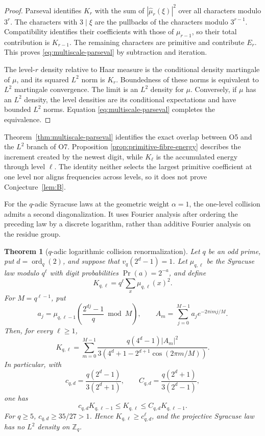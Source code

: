 \documentclass[11pt]{article}
\newtheorem{theorem}{Theorem}[section]
\theoremstyle{definition}
\theoremstyle{remark}
\DeclareMathOperator{\ord}{ord}
\begin{document}
\begin{proof}
Parseval identifies $K_r$ with the sum of
$|\widehat\mu_r(\xi)|^2$ over all characters modulo $3^r$. The
characters with $3\mid\xi$ are the pullbacks of the characters modulo
$3^{r-1}$. Compatibility identifies their coefficients with those of
$\mu_{r-1}$, so their total contribution is $K_{r-1}$. The remaining
characters are primitive and contribute $E_r$. This proves
\eqref{eq:multiscale-parseval} by subtraction and iteration.

The level-$r$ density relative to Haar measure is the conditional
density martingale of $\mu$, and its squared $L^2$ norm is $K_r$.
Boundedness of these norms is equivalent to $L^2$ martingale
convergence. The limit is an $L^2$ density for $\mu$. Conversely, if
$\mu$ has an $L^2$ density, the level densities are its conditional
expectations and have bounded $L^2$ norms. Equation
\eqref{eq:multiscale-parseval} completes the equivalence.
\end{proof}

Theorem~\ref{thm:multiscale-parseval} identifies the exact overlap
between O5 and the $L^2$ branch of O7. Proposition
\ref{prop:primitive-fibre-energy} describes the increment created by
the newest digit, while $K_\ell$ is the accumulated energy through
level $\ell$. The identity neither selects the largest primitive
coefficient at one level nor aligns frequencies across levels, so it
does not prove Conjecture~\ref{lem:B}.

For the $q$-adic Syracuse laws at the geometric weight $\alpha=1$, the
one-level collision admits a second diagonalization. It uses Fourier
analysis after ordering the preceding law by a discrete logarithm,
rather than additive Fourier analysis on the residue group.

\begin{theorem}[$q$-adic logarithmic collision renormalization]
\label{thm:logarithmic-collision}
Let $q$ be an odd prime, put $d=\ord_q(2)$, and suppose that
$v_q(2^d-1)=1$. Let $\mu_{q,\ell}$ be the Syracuse law modulo
$q^\ell$ with digit probabilities $\Pr(a)=2^{-a}$, and define
\[
 K_{q,\ell}=q^\ell\sum_x\mu_{q,\ell}(x)^2.
\]
For $M=q^{\ell-1}$, put
\[
 a_j=\mu_{q,\ell-1}\left(\frac{2^{dj}-1}{q}\bmod M\right),\qquad
 A_m=\sum_{j=0}^{M-1}a_j e^{-2\pi i m j/M}.
\]
Then, for every $\ell\ge1$,
\begin{equation}\label{eq:logarithmic-collision}
 K_{q,\ell}=\sum_{m=0}^{M-1}
 \frac{q(4^d-1)|A_m|^2}
 {3(4^d+1-2^{d+1}\cos(2\pi m/M))}.
\end{equation}
In particular, with
\[
 c_{q,d}=\frac{q(2^d-1)}{3(2^d+1)},\qquad
 C_{q,d}=\frac{q(2^d+1)}{3(2^d-1)},
\]
one has
\begin{equation}\label{eq:logarithmic-bounds}
 c_{q,d}K_{q,\ell-1}\le K_{q,\ell}
 \le C_{q,d}K_{q,\ell-1}.
\end{equation}
For $q\ge5$, $c_{q,d}\ge35/27>1$. Hence
$K_{q,\ell}\ge c_{q,d}^{\ell}$, and the projective Syracuse law has
no $L^2$ density on $\mathbb Z_q$.
\end{theorem}
\end{document}
